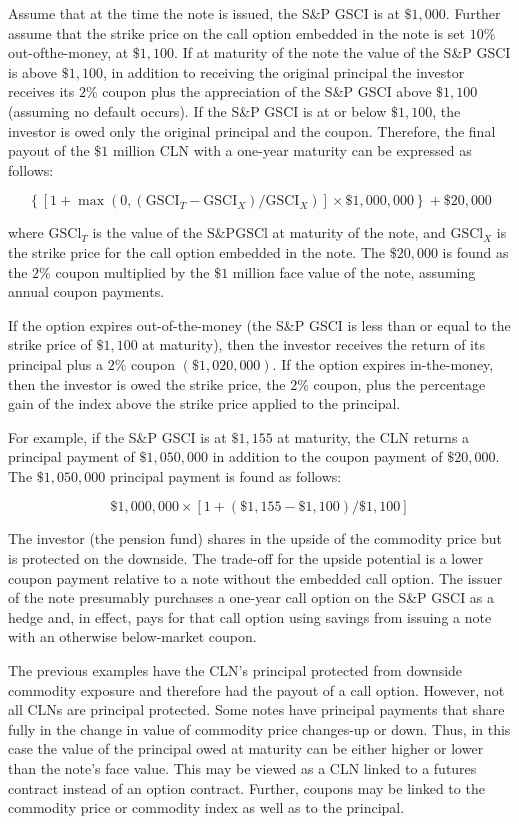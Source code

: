 \documentclass[11pt]{article}
\begin{document}
Assume that at the time the note is issued, the S\&P GSCI is at $\$ 1,000$. Further assume that the strike price on the call option embedded in the note is set $10 \%$ out-ofthe-money, at $\$ 1,100$. If at maturity of the note the value of the S\&P GSCI is above $\$ 1,100$, in addition to receiving the original principal the investor receives its $2 \%$ coupon plus the appreciation of the S\&P GSCI above $\$ 1,100$ (assuming no default occurs). If the S\&P GSCI is at or below $\$ 1,100$, the investor is owed only the original principal and the coupon. Therefore, the final payout of the $\$ 1$ million CLN with a one-year maturity can be expressed as follows:

$$
\left\{\left[1+\max \left(0,\left(\mathrm{GSCI}_{T}-\mathrm{GSCI}_{X}\right) / \mathrm{GSCI}_{X}\right)\right] \times \$ 1,000,000\right\}+\$ 20,000
$$

where $\mathrm{GSCl}_{T}$ is the value of the $\mathrm{S} \& \mathrm{P} \mathrm{GSCl}$ at maturity of the note, and $\mathrm{GSCl}_{X}$ is the strike price for the call option embedded in the note. The $\$ 20,000$ is found as the $2 \%$ coupon multiplied by the $\$ 1$ million face value of the note, assuming annual coupon payments.

If the option expires out-of-the-money (the S\&P GSCI is less than or equal to the strike price of $\$ 1,100$ at maturity), then the investor receives the return of its principal plus a $2 \%$ coupon $(\$ 1,020,000)$. If the option expires in-the-money, then the investor is owed the strike price, the $2 \%$ coupon, plus the percentage gain of the index above the strike price applied to the principal.

For example, if the S\&P GSCI is at $\$ 1,155$ at maturity, the CLN returns a principal payment of $\$ 1,050,000$ in addition to the coupon payment of $\$ 20,000$. The $\$ 1,050,000$ principal payment is found as follows:

$$
\$ 1,000,000 \times[1+(\$ 1,155-\$ 1,100) / \$ 1,100]
$$

The investor (the pension fund) shares in the upside of the commodity price but is protected on the downside. The trade-off for the upside potential is a lower coupon payment relative to a note without the embedded call option. The issuer of the note presumably purchases a one-year call option on the S\&P GSCI as a hedge and, in effect, pays for that call option using savings from issuing a note with an otherwise below-market coupon.

The previous examples have the CLN's principal protected from downside commodity exposure and therefore had the payout of a call option. However, not all CLNs are principal protected. Some notes have principal payments that share fully in the change in value of commodity price changes-up or down. Thus, in this case the value of the principal owed at maturity can be either higher or lower than the note's face value. This may be viewed as a CLN linked to a futures contract instead of an option contract. Further, coupons may be linked to the commodity price or commodity index as well as to the principal.
\end{document}

